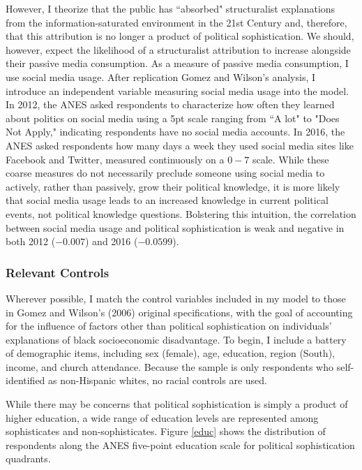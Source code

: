 \documentclass[12pt]{paper}
\begin{document}
However, I theorize that the public has ``absorbed" structuralist explanations from the information-saturated environment in the 21st Century and, therefore, that this attribution is no longer a product of political sophistication. We should, however, expect the likelihood of a structuralist attribution to increase alongside their passive media consumption. As a measure of passive media consumption, I use social media usage. After replication Gomez and Wilson's analysis, I introduce an independent variable measuring social media usage into the model. In 2012, the ANES asked respondents to characterize how often they learned about politics on social media using a 5pt scale ranging from ``A lot" to "Does Not Apply," indicating respondents have no social media accounts. In 2016, the ANES asked respondents how many days a week they used social media sites like Facebook and Twitter, measured continuously on a $0-7$ scale. While these coarse measures do not necessarily preclude someone using social media to actively, rather than passively, grow their political knowledge, it is more likely that social media usage leads to an increased knowledge in current political events, not political knowledge questions. Bolstering this intuition, the correlation between social media usage and political sophistication is weak and negative in both 2012 ($-0.007$) and 2016 ($-0.0599$).

\subsubsection{Relevant Controls}
Wherever possible, I match the control variables included in my model to those in Gomez and Wilson's (2006) original specifications, with the goal of accounting for the influence of factors other than political sophistication on individuals' explanations of black socioeconomic disadvantage. To begin, I include a battery of demographic items, including sex (female), age, education, region (South), income, and church attendance. Because the sample is only respondents who self-identified as non-Hispanic whites, no racial controls are used.

While there may be concerns that political sophistication is simply a product of higher education, a wide range of education levels are represented among sophisticates and non-sophisticates. Figure \ref{educ} shows the distribution of respondents along the ANES five-point education scale for political sophistication quadrants. 
\end{document}
